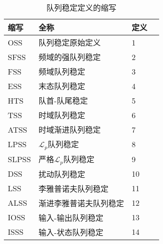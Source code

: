 \begin{translation}
\begin{table}
  \centering
  \caption{队列稳定定义的缩写}
  \begin{tabular}{llll}
    \toprule
    缩写       &  全称                &   定义       \\
    \midrule
    OSS       &  队列稳定原始定义              &  1           \\
    SFSS      &  频域的强队列稳定              &  2           \\
    FSS       &  频域队列稳定                 &  3           \\
    ESS       &  末态队列稳定                 &  4           \\
    HTS       &  队首-队尾稳定                &  5           \\
    TSS       &  时域队列稳定                 &  6           \\
    ATSS      &  时域渐进队列稳定              &  7           \\
    LPSS      &  $\mathcal{L}_p$队列稳定     &  8           \\
    SLPSS     &  严格$\mathcal{L}_p$队列稳定  &  9           \\
    DSS       &  扰动队列稳定                 &  10          \\
    LSS       &  李雅普诺夫队列稳定            &  11          \\
    ALSS      &  渐进李雅普诺夫队列稳定        &  12          \\
    IOSS      &  输入-输出队列稳定            &  13          \\
    ISSS      &  输入-状态队列稳定            &  14          \\
    \bottomrule
  \end{tabular}
  \label{tab:appendix-translation-tableA2}
\end{table}




\begin{translation-index}
  \nocite{salomon1995advanced}
  
  
\end{translation-index}

\end{translation}
